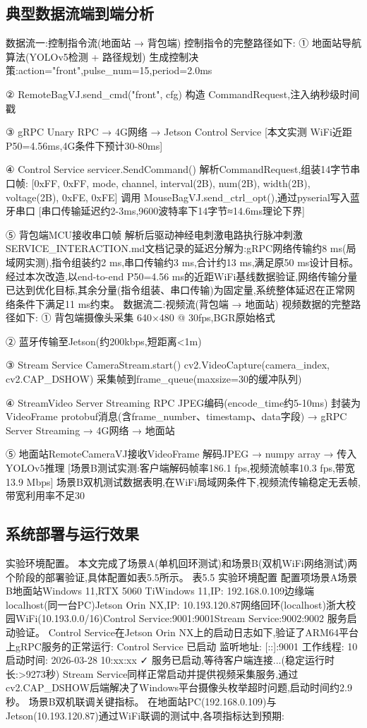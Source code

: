 \subsection{典型数据流端到端分析}
数据流一:控制指令流(地面站 → 背包端)
控制指令的完整路径如下:
① 地面站导航算法(YOLOv5检测 + 路径规划)
   生成控制决策:action="front",pulse_num=15,period=2.0ms

② RemoteBagVJ.send_cmd("front", cfg)
   构造 CommandRequest,注入纳秒级时间戳

③ gRPC Unary RPC → 4G网络 → Jetson Control Service
   [本文实测 WiFi近距P50=4.56ms,4G条件下预计30-80ms]

④ Control Service servicer.SendCommand()
   解析CommandRequest,组装14字节串口帧:
   [0xFF, 0xFF, mode, channel, interval(2B), num(2B), width(2B), voltage(2B), 0xFE, 0xFE]
   调用 MouseBagVJ.send_ctrl_opt(),通过pyserial写入蓝牙串口
   [串口传输延迟约2-3ms,9600波特率下14字节≈14.6ms理论下界]

⑤ 背包端MCU接收串口帧
   解析后驱动神经电刺激电路执行脉冲刺激
SERVICE_INTERACTION.md文档记录的延迟分解为:gRPC网络传输约8 ms(局域网实测),指令组装约2 ms,串口传输约3 ms,合计约13 ms,满足原50 ms设计目标。经过本次改造,以end-to-end P50=4.56 ms的近距WiFi基线数据验证,网络传输分量已达到优化目标,其余分量(指令组装、串口传输)为固定量,系统整体延迟在正常网络条件下满足11 ms约束。
数据流二:视频流(背包端 → 地面站)
视频数据的完整路径如下:
① 背包端摄像头采集
   640×480 @ 30fps,BGR原始格式

② 蓝牙传输至Jetson(约200kbps,短距离<1m)

③ Stream Service CameraStream.start()
   cv2.VideoCapture(camera_index, cv2.CAP_DSHOW)
   采集帧到frame_queue(maxsize=30的缓冲队列)

④ StreamVideo Server Streaming RPC
   JPEG编码(encode_time约5-10ms)
   封装为VideoFrame protobuf消息(含frame_number、timestamp、data字段)
   → gRPC Server Streaming → 4G网络 → 地面站

⑤ 地面站RemoteCameraVJ接收VideoFrame
   解码JPEG → numpy array → 传入YOLOv5推理
   [场景B测试实测:客户端解码帧率186.1 fps,视频流帧率10.3 fps,带宽13.9 Mbps]
场景B双机测试数据表明,在WiFi局域网条件下,视频流传输稳定无丢帧,带宽利用率不足30%
\subsection{系统部署与运行效果}
实验环境配置。 本文完成了场景A(单机回环测试)和场景B(双机WiFi网络测试)两个阶段的部署验证,具体配置如表5.5所示。
表5.5 实验环境配置
配置项场景A场景B地面站Windows 11,RTX 5060 TiWindows 11,IP: 192.168.0.109边缘端localhost(同一台PC)Jetson Orin NX,IP: 10.193.120.87网络回环(localhost)浙大校园WiFi(10.193.0.0/16)Control Service:9001:9001Stream Service:9002:9002
服务启动验证。 Control Service在Jetson Orin NX上的启动日志如下,验证了ARM64平台上gRPC服务的正常运行:
Control Service 已启动
监听地址: [::]:9001
工作线程: 10
启动时间: 2026-03-28 10:xx:xx
✓ 服务已启动,等待客户端连接...(稳定运行时长:>9273秒)
Stream Service同样正常启动并提供视频采集服务,通过cv2.CAP_DSHOW后端解决了Windows平台摄像头枚举超时问题,启动时间约2.9秒。
场景B双机联调关键指标。 在地面站PC(192.168.0.109)与Jetson(10.193.120.87)通过WiFi联调的测试中,各项指标达到预期:

